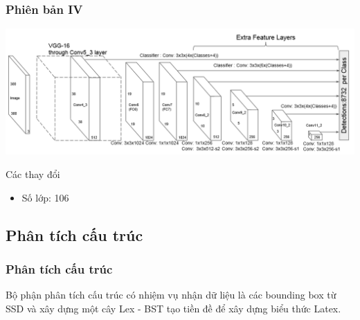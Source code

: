 \documentclass{beamer}
\begin{document}
	\begin{frame}
		\frametitle{Phiên bản IV}
		\begin{center}
			\centering
			\includegraphics[width=0.95\linewidth]{SSD_Struture.png}
		\end{center}
		\begin{block}{Các thay đổi}
			\begin{itemize}
				\item Số lớp: 106
			\end{itemize}
		\end{block}
	\end{frame}
	
	
\subsection{Phân tích cấu trúc}
\begin{frame}
	\frametitle{Phân tích cấu trúc}
	Bộ phận phân tích cấu trúc có nhiệm vụ nhận dữ liệu là các bounding box từ SSD\cite{liu2016ssd} và xây dựng một cây Lex - BST tạo tiền đề để xây dựng biểu thức Latex.
\end{frame}

\end{document}

